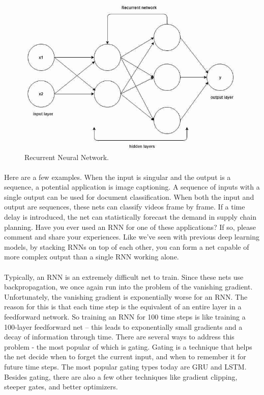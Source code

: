 \documentclass{article}
\begin{document}
    \begin{figure}[h!]
      \begin{center}
        \includegraphics[width=0.8\linewidth]{img/Recurrent.jpeg}
        \caption{Recurrent Neural Network.}
        \label{fig:snn}
      \end{center}
    \end{figure}
    
    \paragraph{}
    Here are a few examples. When the input is  singular and the output is a sequence, a potential  application is image captioning. A sequence  of inputs with a single output can be used  for document classification. When both the  input and output are sequences, these nets  can classify videos frame by frame. If a time  delay is introduced, the net can statistically  forecast the demand in supply chain planning.  Have you ever used an RNN for one of these  applications? If so, please comment and share  your experiences.  Like we’ve seen with previous deep learning  models, by stacking RNNs on top of each other,  you can form a net capable of more complex  output than a single RNN working alone.
    \paragraph{}
    Typically, an RNN is an extremely difficult  net to train. Since these nets use backpropagation,  we once again run into the problem of the  vanishing gradient. Unfortunately, the vanishing  gradient is exponentially worse for an RNN.  The reason for this is that each time step  is the equivalent of an entire layer in a  feedforward network. So training an RNN for  100 time steps is like training a 100-layer  feedforward net – this leads to exponentially  small gradients and a decay of information  through time.  There are several ways to address this problem  - the most popular of which is gating. Gating  is a technique that helps the net decide when  to forget the current input, and when to remember  it for future time steps. The most popular  gating types today are GRU and LSTM. Besides  gating, there are also a few other techniques  like gradient clipping, steeper gates, and  better optimizers.
\end{document}
